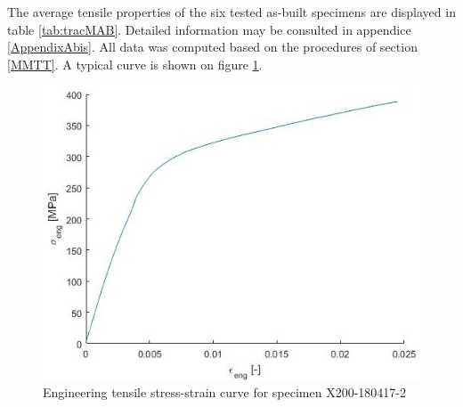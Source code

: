 The average tensile properties of the six tested as-built specimens are displayed in table \ref{tab:tracMAB}. Detailed information may be consulted in appendice \ref{AppendixAbis}. All data was computed based on the procedures of section \ref{MMTT}. A typical curve is shown on figure \ref{fig:trac2}.\\

 \begin{center}
\begin{table}[ht]
\noindent{}

\caption[Average tensile mechanical properties of the as-built specimens from batch X200-180417]{Average tensile mechanical properties of the as-built specimens from batch X200-180417}
\label{tab:tracMAB}
\end{table}
 \end{center}
 
 \begin{figure}[ht]
\centering
\centerline{\includegraphics[scale=0.68]{Images/trac2}}
\decoRule
\caption[Engineering tensile stress-strain curve for specimen X200-180417-2]{Engineering tensile stress-strain curve for specimen X200-180417-2}
\label{fig:trac2}
\end{figure} 
 
